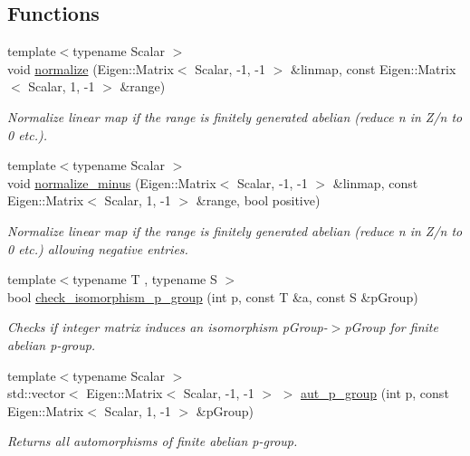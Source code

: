 \subsection*{Functions}
\begin{DoxyCompactItemize}
\item 
{\footnotesize template$<$typename Scalar $>$ }\\void \hyperlink{namespaceMackey_a40d5c8d3e43cd2ee3df09664bc8c56ea}{normalize} (Eigen\+::\+Matrix$<$ Scalar, -\/1, -\/1 $>$ \&linmap, const Eigen\+::\+Matrix$<$ Scalar, 1, -\/1 $>$ \&range)
\begin{DoxyCompactList}\small\item\em Normalize linear map if the range is finitely generated abelian (reduce n in Z/n to 0 etc.). \end{DoxyCompactList}\item 
{\footnotesize template$<$typename Scalar $>$ }\\void \hyperlink{namespaceMackey_a463bb762b4edc2f283e8d1c0c466aedf}{normalize\+\_\+minus} (Eigen\+::\+Matrix$<$ Scalar, -\/1, -\/1 $>$ \&linmap, const Eigen\+::\+Matrix$<$ Scalar, 1, -\/1 $>$ \&range, bool positive)
\begin{DoxyCompactList}\small\item\em Normalize linear map if the range is finitely generated abelian (reduce n in Z/n to 0 etc.) allowing negative entries. \end{DoxyCompactList}\item 
{\footnotesize template$<$typename T , typename S $>$ }\\bool \hyperlink{namespaceMackey_aa96cf972d89b207ce6709e867f760f37}{check\+\_\+isomorphism\+\_\+p\+\_\+group} (int p, const T \&a, const S \&p\+Group)
\begin{DoxyCompactList}\small\item\em Checks if integer matrix induces an isomorphism p\+Group-\/$>$p\+Group for finite abelian p-\/group. \end{DoxyCompactList}\item 
{\footnotesize template$<$typename Scalar $>$ }\\std\+::vector$<$ Eigen\+::\+Matrix$<$ Scalar, -\/1, -\/1 $>$ $>$ \hyperlink{namespaceMackey_ab3832e52497b387d4553af06aa26ec99}{aut\+\_\+p\+\_\+group} (int p, const Eigen\+::\+Matrix$<$ Scalar, 1, -\/1 $>$ \&p\+Group)
\begin{DoxyCompactList}\small\item\em Returns all automorphisms of finite abelian p-\/group. \end{DoxyCompactList}\item 

\end{DoxyCompactItemize}
